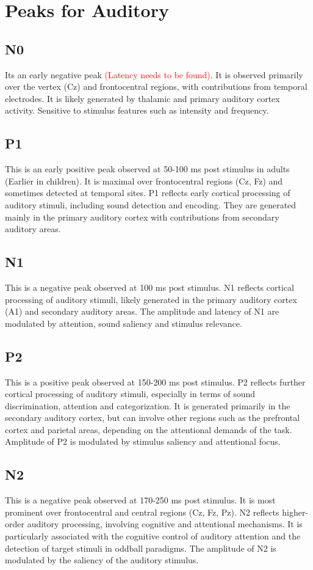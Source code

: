 \documentclass{article}
\begin{document}
	\section{Peaks for Auditory}
	\subsection{N0}
	Its an early negative peak \textcolor{red}{(Latency needs to be found)}. It is observed primarily over the vertex (Cz) and frontocentral regions, with contributions from temporal electrodes. It is likely generated by thalamic and primary auditory cortex activity. Sensitive to stimulus features such as intensity and frequency.
	
	\subsection{P1}
	This is an early positive peak observed at 50-100 ms post stimulus in adults (Earlier in children). It is maximal over frontocentral regions (Cz, Fz) and sometimes detected at temporal sites. P1 reflects early cortical processing of auditory stimuli, including sound detection and encoding. They are generated mainly in the primary auditory cortex with contributions from secondary auditory areas.
	
	\subsection{N1}
	This is a negative peak observed at 100 ms post stimulus. N1 reflects cortical processing of auditory stimuli, likely generated in the primary auditory cortex (A1) and secondary auditory areas. The amplitude and latency of N1 are modulated by attention, sound saliency and stimulus relevance.
	
	\subsection{P2}
	This is a positive peak observed at 150-200 ms post stimulus. P2 reflects further cortical processing of auditory stimuli, especially in terms of sound discrimination, attention and categorization. It is generated primarily in the secondary auditory cortex, but can involve other regions such as the prefrontal cortex and parietal areas, depending on the attentional demands of the task. Amplitude of P2 is modulated by stimulus saliency and attentional focus.
	
	\subsection{N2}
	This is a negative peak observed at 170-250 ms post stimulus. It is most prominent over frontocentral and central regions (Cz, Fz, Pz). N2 reflects higher-order auditory processing, involving cognitive and attentional mechanisms. It is particularly associated with the cognitive control of auditory attention and the detection of target stimuli in oddball paradigms. The amplitude of N2 is modulated by the saliency of the auditory stimulus.
	
\end{document}
